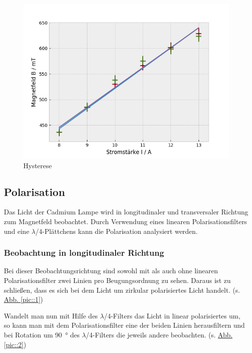     \begin{figure}[H]
      \centering
      \includegraphics[width=.6\paperwidth]{Auswertung/hysteresis}
      \caption{Hysterese}
      \label{plot::1}
    \end{figure}

  \subsection{Polarisation}
    Das Licht der Cadmium Lampe wird in longitudinaler und transversaler Richtung zum Magnetfeld beobachtet. Durch Verwendung eines linearen Polarisationsfilters und eine $\lambda$/4-Plättchens kann die Polarisation analysiert werden.

    \subsubsection{Beobachtung in longitudinaler Richtung}
      Bei dieser Beobachtungsrichtung sind sowohl mit als auch ohne linearen Polarisationsfilter zwei Linien pro Beugungsordnung zu sehen. Daraus ist zu schließen, dass es sich bei dem Licht um zirkular polarisiertes Licht handelt. (s. \hyperref[pic::1]{Abb. \ref*{pic::1}})

      Wandelt man nun mit Hilfe des $\lambda$/4-Filters das Licht in linear polarisiertes um, so kann man mit dem Polarisationsfilter eine der beiden Linien herausfiltern und bei Rotation um \SI{90}{°} des $\lambda$/4-Filters die jeweils andere beobachten. (s. \hyperref[pic::2]{Abb. \ref*{pic::2}})

